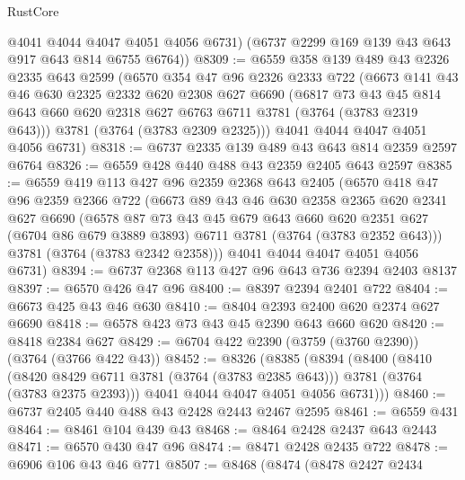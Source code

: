 \begin{lexlean}{RustCore}
\begin{coremodule}
        @4041
        @4044
        @4047
        @4051
        @4056
        @6731)
      (@6737 @2299 @169 @139 @43 @643 @917 @643 @814 @6755 @6764))
@8309 := @6559
    @358
    @139
    @489
    @43
    @2326
    @2335
    @643
    @2599
    (@6570
      @354
      @47
      @96
      @2326
      @2333
      @722
      (@6673
        @141
        @43
        @46
        @630
        @2325
        @2332
        @620
        @2308
        @627
        @6690
        (@6817
          @73
          @43
          @45
          @814
          @643
          @660
          @620
          @2318
          @627
          @6763
          @6711
          @3781
          (@3764 (@3783 @2319 @643)))
        @3781
        (@3764 (@3783 @2309 @2325)))
      @4041
      @4044
      @4047
      @4051
      @4056
      @6731)
@8318 := @6737 @2335 @139 @489 @43 @643 @814 @2359 @2597 @6764
@8326 := @6559 @428 @440 @488 @43 @2359 @2405 @643 @2597
@8385 := @6559
    @419
    @113
    @427
    @96
    @2359
    @2368
    @643
    @2405
    (@6570
      @418
      @47
      @96
      @2359
      @2366
      @722
      (@6673
        @89
        @43
        @46
        @630
        @2358
        @2365
        @620
        @2341
        @627
        @6690
        (@6578
          @87
          @73
          @43
          @45
          @679
          @643
          @660
          @620
          @2351
          @627
          (@6704 @86 @679 @3889 @3893)
          @6711
          @3781
          (@3764 (@3783 @2352 @643)))
        @3781
        (@3764 (@3783 @2342 @2358)))
      @4041
      @4044
      @4047
      @4051
      @4056
      @6731)
@8394 := @6737 @2368 @113 @427 @96 @643 @736 @2394 @2403 @8137
@8397 := @6570 @426 @47 @96
@8400 := @8397 @2394 @2401 @722
@8404 := @6673 @425 @43 @46 @630
@8410 := @8404 @2393 @2400 @620 @2374 @627 @6690
@8418 := @6578 @423 @73 @43 @45 @2390 @643 @660 @620
@8420 := @8418 @2384 @627
@8429 := @6704 @422 @2390 (@3759 (@3760 @2390)) (@3764 (@3766 @422 @43))
@8452 := @8326
    (@8385
      (@8394
        (@8400
          (@8410
            (@8420 @8429 @6711 @3781 (@3764 (@3783 @2385 @643)))
            @3781
            (@3764 (@3783 @2375 @2393)))
          @4041
          @4044
          @4047
          @4051
          @4056
          @6731)))
@8460 := @6737 @2405 @440 @488 @43 @2428 @2443 @2467 @2595
@8461 := @6559 @431
@8464 := @8461 @104 @439 @43
@8468 := @8464 @2428 @2437 @643 @2443
@8471 := @6570 @430 @47 @96
@8474 := @8471 @2428 @2435 @722
@8478 := @6906 @106 @43 @46 @771
@8507 := @8468
    (@8474
      (@8478
        @2427
        @2434

\end{coremodule}
\end{lexlean}
